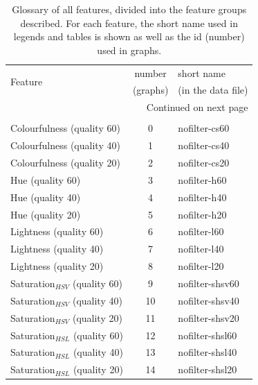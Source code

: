 \documentclass[11pt,a4paper,twoside,openright]{report}
\begin{document}
\begin{center}
\footnotesize
\begin{longtable}{|l|c|l|}
\toprule
\multirow{2}{*}{Feature} & number   & short name         \\
                         & (graphs) & (in the data file) \\
\midrule
\endhead

\midrule
\multicolumn{3}{r}{{Continued on next page}} \\
\cmidrule{2-3}
\endfoot

\bottomrule
\caption[Feature glossary]{Glossary of all features, divided into the feature
groups described.  For each feature, the short name used in legends and tables
is shown as well as the id (number) used in graphs.}
\label{tab:glossary}
\endlastfoot

\midrule
\multicolumn{3}{c}{Komogorov Complexity for$\ldots$} \\
\midrule
Colourfulness (quality 60)                      &  0 & nofilter-cs60   \\
Colourfulness (quality 40)                      &  1 & nofilter-cs40   \\
Colourfulness (quality 20)                      &  2 & nofilter-cs20   \\
Hue (quality 60)                                &  3 & nofilter-h60    \\
Hue (quality 40)                                &  4 & nofilter-h40    \\
Hue (quality 20)                                &  5 & nofilter-h20    \\
Lightness (quality 60)                          &  6 & nofilter-l60    \\
Lightness (quality 40)                          &  7 & nofilter-l40    \\
Lightness (quality 20)                          &  8 & nofilter-l20    \\
Saturation$_{HSV}$ (quality 60)                 &  9 & nofilter-shsv60 \\
Saturation$_{HSV}$ (quality 40)                 & 10 & nofilter-shsv40 \\
Saturation$_{HSV}$ (quality 20)                 & 11 & nofilter-shsv20 \\
Saturation$_{HSL}$ (quality 60)                 & 12 & nofilter-shsl60 \\
Saturation$_{HSL}$ (quality 40)                 & 13 & nofilter-shsl40 \\
Saturation$_{HSL}$ (quality 20)                 & 14 & nofilter-shsl20 \\

\end{longtable}
\end{center}
\end{document}
